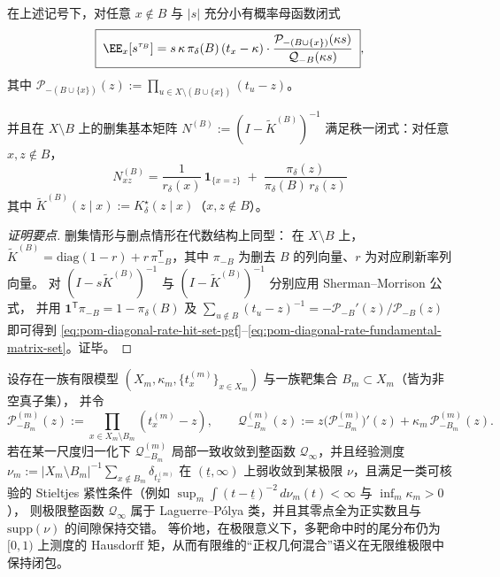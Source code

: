 \begin{theorem}\label{thm:pom-diagonal-rate-absorbing-set-hit-and-occupancy}
在上述记号下，对任意 \(x\notin B\) 与 \(|s|\) 充分小有概率母函数闭式
\begin{equation}\label{eq:pom-diagonal-rate-hit-set-pgf}
\boxed{\;
\EE_x[s^{\tau_B}]
=
s\,\kappa\,\pi_\delta(B)\,(t_x-\kappa)\cdot
\frac{\mathcal P_{-(B\cup\{x\})}(\kappa s)}{\mathcal Q_{-B}(\kappa s)}\; } ,
\end{equation}
其中 \(\mathcal P_{-(B\cup\{x\})}(z):=\prod_{u\in X\setminus(B\cup\{x\})}(t_u-z)\)。
\par
并且在 \(X\setminus B\) 上的删集基本矩阵
\(
N^{(B)}:=(I-\widetilde K^{(B)})^{-1}
\)
满足秩一闭式：对任意 \(x,z\notin B\)，
\begin{equation}\label{eq:pom-diagonal-rate-fundamental-matrix-set}
\boxed{\;
N^{(B)}_{xz}
=\frac{1}{r_\delta(x)}\,\mathbf 1_{\{x=z\}}
\;+\;
\frac{\pi_\delta(z)}{\pi_\delta(B)\,r_\delta(z)}\;}
\end{equation}
其中 \(\widetilde K^{(B)}(z\mid x):=K^\star_\delta(z\mid x)\)（\(x,z\notin B\)）。
\end{theorem}
\begin{proof}[证明要点]
删集情形与删点情形在代数结构上同型：
在 \(X\setminus B\) 上，\(\widetilde K^{(B)}=\mathrm{diag}(1-r)+r\,\pi_{-B}^{\mathsf T}\)，其中 \(\pi_{-B}\) 为删去 \(B\) 的列向量、\(r\) 为对应刷新率列向量。
对 \((I-s\widetilde K^{(B)})^{-1}\) 与 \((I-\widetilde K^{(B)})^{-1}\) 分别应用 Sherman--Morrison 公式，
并用 \(\mathbf 1^{\mathsf T}\pi_{-B}=1-\pi_\delta(B)\) 及
\(
\sum_{u\notin B}(t_u-z)^{-1}=-\mathcal P_{-B}'(z)/\mathcal P_{-B}(z)
\)
即可得到 \eqref{eq:pom-diagonal-rate-hit-set-pgf}--\eqref{eq:pom-diagonal-rate-fundamental-matrix-set}。证毕。
\end{proof}

\begin{conjecture}\label{conj:pom-diagonal-rate-absorbing-laguerre-polya-closure}
设存在一族有限模型 \((X_m,\kappa_m,\{t_x^{(m)}\}_{x\in X_m})\) 与一族靶集合 \(B_m\subset X_m\)（皆为非空真子集），
并令
\[
\mathcal P_{-B_m}^{(m)}(z):=\prod_{x\in X_m\setminus B_m}(t_x^{(m)}-z),
\qquad
\mathcal Q_{-B_m}^{(m)}(z):=z\bigl(\mathcal P_{-B_m}^{(m)}\bigr)'(z)+\kappa_m\,\mathcal P_{-B_m}^{(m)}(z).
\]
若在某一尺度归一化下 \(\mathcal Q_{-B_m}^{(m)}\) 局部一致收敛到整函数 \(\mathcal Q_\infty\)，并且经验测度
\(
\nu_m:=|X_m\setminus B_m|^{-1}\sum_{x\notin B_m}\delta_{t_x^{(m)}}
\)
在 \((\underline t,\infty)\) 上弱收敛到某极限 \(\nu\)，且满足一类可核验的 Stieltjes 紧性条件（例如 \(\sup_m\int (t-\underline t)^{-2}\,d\nu_m(t)<\infty\) 与 \(\inf_m\kappa_m>0\)），
则极限整函数 \(\mathcal Q_\infty\) 属于 Laguerre--Pólya 类，并且其零点全为正实数且与 \(\mathrm{supp}(\nu)\) 的间隙保持交错。
等价地，在极限意义下，多靶命中时的尾分布仍为 \([0,1)\) 上测度的 Hausdorff 矩，从而有限维的“正权几何混合”语义在无限维极限中保持闭包。
\end{conjecture}

\endinput
